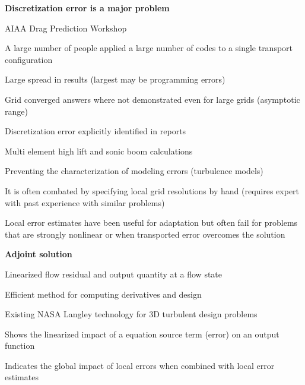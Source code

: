\documentclass[landscape]{slides}
\renewcommand{\title}[1]{{\large\bfseries #1}}
\newenvironment{itemiz}%
  {\begin{list}{}{\raggedright
      \setlength{\itemsep}{2pt}%
      \setlength{\parskip}{4pt}\setlength{\parsep}{2pt}}}%
  {\end{list}}%
\begin{document}
 \begin{slide}
   \title{ Discretization error is a major problem }
   \begin{itemiz}
   \item AIAA Drag Prediction Workshop
     \begin{itemiz}
     \item A large number of people applied a large number of codes to
     a single transport configuration
     \item Large spread in results (largest may be programming errors)
     \item Grid converged answers where not demonstrated even for large
       grids (asymptotic range)
     \item Discretization error explicitly identified in reports 
     \end{itemiz}
   \item Multi element high lift and sonic boom calculations
   \item Preventing the characterization of modeling errors (turbulence models)
   \item It is often combated by specifying local grid resolutions by
   hand (requires expert with past experience with similar problems)
   \item Local error estimates have been useful for adaptation but
     often fail for problems that are strongly nonlinear or when
     transported error overcomes the solution
   \end{itemiz}
 \end{slide}
   
 \begin{slide}
   \title{ Adjoint solution }
   \begin{itemiz}
   \item Linearized flow residual and output quantity at a flow state
   \item Efficient method for computing derivatives and design
   \item Existing NASA Langley technology for 3D turbulent design problems
   \item Shows the linearized impact of a equation source term (error)
     on an output function
   \item Indicates the global impact of local errors when combined with
   local error estimates
   \end{itemiz}
 \end{slide}
\end{document}
